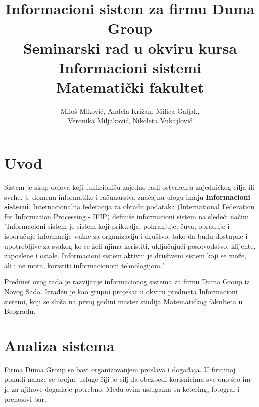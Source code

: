 \documentclass[a4paper]{article}
\begin{document}
\title{Informacioni sistem za firmu Duma Group\\ \small{Seminarski rad u okviru kursa\\Informacioni sistemi\\ Matematički fakultet}}

\author{Miloš Miković, Anđela Križan, Milica Galjak, \\ Veronika Miljaković, Nikoleta Vukajlović}


\maketitle

\newpage
\tableofcontents

\newpage

\section{Uvod}

 Sistem je skup delova koji funkcionišu zajedno radi ostvarenja zajedničkog cilja ili svrhe. U domenu informatike i računarstva značajnu ulogu imaju \textbf{Informacioni sistemi}. Internacionalna federacija za obradu podataka (International Federation for Information Processing - IFIP) definiše informacioni sistem na sledeći način: "Informacioni sistem je sistem koji prikuplja, pohranjuje, čuva, obrađuje i isporučuje informacije važne za organizaciju i društvo, tako da budu dostupne i upotrebljive za svakog ko se želi njima koristiti, uključujući poslovodstvo, klijente, zaposlene i ostale. Informacioni sistem aktivni je društveni sistem koji se može, ali i ne mora, koristiti      informacionom tehnologijom." 
    
 Predmet ovog rada je razvijanje informacionog sistema za firmu Duma Group iz Novog Sada. Izrađen je kao grupni projekat u okviru predmeta Informacioni sistemi, koji se sluša na prvoj godini master studija Matematičkog fakulteta u Beogradu.

\section{Analiza sistema}

Firma Duma Group se bavi organizovanjem proslava i događaja. U firminoj ponudi nalaze se brojne usluge čiji je cilj da obezbedi korisnicima sve ono što im je za njihove događaje potrebno. Među ovim uslugama su ketering, fotograf i prenosivi bar.
\end{document}
